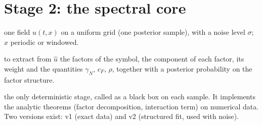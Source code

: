 \documentclass[11pt,a4paper]{article}
\theoremstyle{definition}
\newcommand{\sectionbrief}[3]{\begin{leadin}\begin{description}[nosep,leftmargin=3.0cm,labelwidth=2.8cm]
  \item[Starting from] #1
  \item[Why this section] #2
  \item[Role in the paper] #3
  \end{description}\end{leadin}}
\begin{document}


\section{Stage 2: the spectral core}\label{sec:core}
\sectionbrief
{one field $\hat u(t,x)$ on a uniform grid (one posterior sample), with a noise level $\sigma$; $x$ periodic or windowed.}
{to extract from $\hat u$ the factors of the symbol, the component of each factor, its weight and the quantities $\gamma_N$, $c_F$, $\rho$, together with a posterior probability on the factor structure.}
{the only deterministic stage, called as a black box on each sample. It implements the analytic theorems (factor decomposition, interaction term) on numerical data. Two versions exist: v1 (exact data) and v2 (structured fit, used with noise).}
\end{document}
